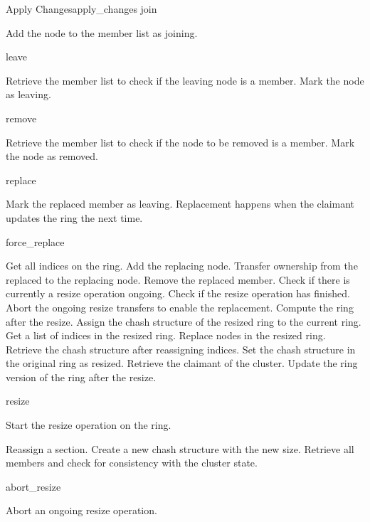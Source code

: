 \begin{actionbox}[height=\textheight]{Apply Changes}{apply_changes}
	\small
	join
	\begin{action}
		 Add the node to the member list as joining.
	\end{action}
	leave
	\begin{action}
		 Retrieve the member list to check if the leaving node is a member.
		 Mark the node as leaving.
	\end{action}
	remove
	\begin{action}
		 Retrieve the member list to check if the node to be removed is a member.
		 Mark the node as removed.
	\end{action}
	replace
	\begin{action}
		 Mark the replaced member as leaving. Replacement happens when the claimant updates the ring the next time.
	\end{action}
	force\_replace
	\begin{action}
		 Get all indices on the ring.
		 Add the replacing node.
		 Transfer ownership from the replaced to the replacing node.
		 Remove the replaced member.
		 Check if there is currently a resize operation ongoing.
		 Check if the resize operation has finished.
		 Abort the ongoing resize transfers to enable the replacement.
		 Compute the ring after the resize.
		 Assign the chash structure of the resized ring to the current ring.
		 Get a list of indices in the resized ring.
		 Replace nodes in the resized ring.
		 Retrieve the chash structure after reassigning indices.
		 Set the chash structure in the original ring as resized.
		 Retrieve the claimant of the cluster.
		 Update the ring version of the ring after the resize.
	\end{action}
	resize
	\begin{action}
		 Start the resize operation on the ring.
		\begin{action}
			 Reassign a section.
			 Create a new chash structure with the new size.
			 Retrieve all members and check for consistency with the cluster state.
		\end{action}
	\end{action}
	abort\_resize
	\begin{action}
		 Abort an ongoing resize operation.
	\end{action}
\end{actionbox}

